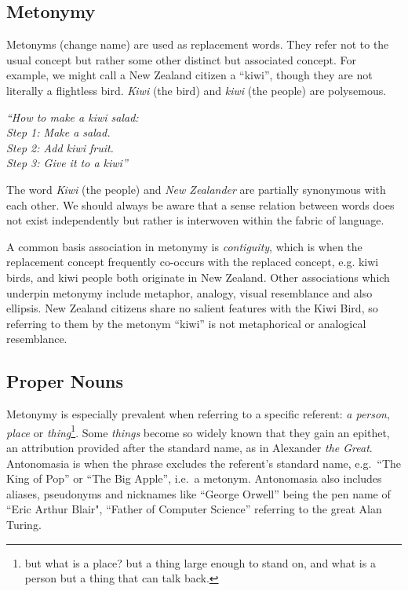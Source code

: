 \subsection{Metonymy}

Metonyms (change name) are used as replacement words. They refer not to the usual concept but rather some other distinct but associated concept. For example, we might call a New Zealand citizen a ``kiwi'', though they are not literally a flightless bird. \textit{Kiwi} (the bird) and \textit{kiwi} (the people) are polysemous.

\begin{center}
	\textit{``How to make a kiwi salad: \\
	Step 1: Make a salad. \\
	Step 2: Add kiwi fruit. \\
	Step 3: Give it to a kiwi''}
\end{center}

The word \textit{Kiwi} (the people) and \textit{New Zealander} are partially synonymous with each other. We should always be aware that a sense relation between words does not exist independently but rather is interwoven within the fabric of language.

A common basis association in metonymy is \textit{contiguity}, which is when the replacement concept frequently co-occurs with the replaced concept, e.g. kiwi birds, and kiwi people both originate in New Zealand. Other associations which underpin metonymy include metaphor, analogy, visual resemblance and also ellipsis. New Zealand citizens share no salient features with the Kiwi Bird, so referring to them by the metonym ``kiwi'' is not metaphorical or analogical resemblance.

\subsection{Proper Nouns}
Metonymy is especially prevalent when referring to a specific referent: \textit{a person}, \textit{place} or \textit{thing}\footnote{but what is a place? but a thing large enough to stand on, and what is a person but a thing that can talk back.}. Some \textit{things} become so widely known that they gain an epithet, an attribution provided after the standard name, as in Alexander \textit{the Great}. Antonomasia is when the phrase excludes the referent's standard name, e.g.\ ``The King of Pop'' or ``The Big Apple'', i.e.\ a metonym. Antonomasia also includes aliases, pseudonyms and nicknames like ``George Orwell'' being the pen name of ``Eric Arthur Blair", ``Father of Computer Science'' referring to the great Alan Turing. %

